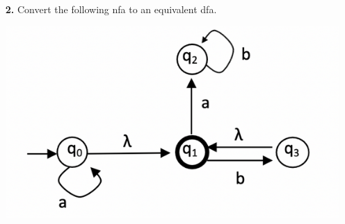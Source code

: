 \documentclass[ 12pt ]{article}
\begin{document}
\begin{enumerate}
	\item[\textbf{2.}] Convert the following nfa to an equivalent dfa. 
		\begin{center}
			\includegraphics{Capture}
		\end{center}


\end{enumerate}
\end{document}
